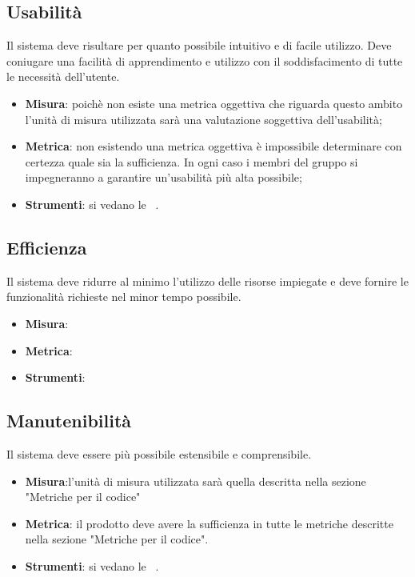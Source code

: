 \documentclass[../PianoDiQualifica.tex]{subfiles}
\begin{document}
	\subsection{Usabilità}
		Il sistema deve risultare per quanto possibile intuitivo e di facile utilizzo. Deve coniugare una facilità di apprendimento e utilizzo con il soddisfacimento di tutte le necessità dell'utente.
		\begin{itemize}
			\item \textbf{Misura}: poichè non esiste una metrica oggettiva che riguarda questo ambito l'unità di misura utilizzata sarà una valutazione soggettiva dell'usabilità;
			\item \textbf{Metrica}: non esistendo una metrica oggettiva è impossibile determinare con certezza quale sia la sufficienza. In ogni caso i membri del gruppo si impegneranno a garantire un'usabilità più alta possibile;
			\item \textbf{Strumenti}: si vedano le \normediprogettov\ .
		\end{itemize}
	\subsection{Efficienza}
		Il sistema deve ridurre al minimo l'utilizzo delle risorse impiegate e deve fornire le funzionalità richieste nel minor tempo possibile.
		\begin{itemize}
			\item \textbf{Misura}:
			\item \textbf{Metrica}:
			\item \textbf{Strumenti}: 	
		\end{itemize}
	\subsection{Manutenibilità}
		Il sistema deve essere più possibile estensibile e comprensibile.
		\begin{itemize}
			\item \textbf{Misura}:l'unità di misura utilizzata sarà quella descritta nella sezione "Metriche per il codice" %
			\item \textbf{Metrica}: il prodotto deve avere la sufficienza in tutte le metriche descritte nella sezione "Metriche per il codice".
			\item \textbf{Strumenti}: si vedano le \normediprogettov\ .	
		\end{itemize}
\end{document}
